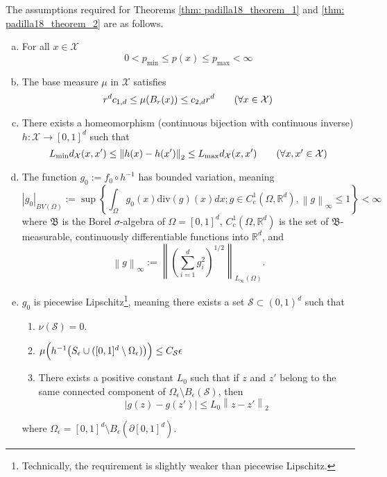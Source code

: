 \documentclass{article}
\newcommand{\Reals}{\mathbb{R}}
\newcommand{\norm}[1]{\left\lVert#1\right\rVert}
\newcommand{\abs}[1]{\left \lvert #1 \right \rvert}
\newcommand{\set}[1]{\left\{#1\right\}}
\newcommand{\Rd}{\Reals^d}
\newcommand{\Xset}{\mathcal{X}}
\newcommand{\Sset}{\mathcal{S}}
\newcommand{\dive}{\mathrm{div}}
\theoremstyle{alden}
\theoremstyle{aldenthm}
\theoremstyle{definition}
\theoremstyle{remark}
\begin{document}
The assumptions required for Theorems \ref{thm: padilla18_theorem_1} and \ref{thm: padilla18_theorem_2} are as follows.
\begin{enumerate}[(a)]
	\item For all $x \in \Xset$
	\begin{equation*}
	0 < p_{\min} \leq p(x) \leq p_{\max} < \infty
	\end{equation*}
	\item The base measure $\mu$ in $\Xset$ satisfies
	\begin{equation*}
	r^d c_{1,d} \leq \mu(B_r(x)) \leq c_{2,d} r^d \tag{$\forall x \in \Xset$}
	\end{equation*}
	\item There exists a homeomorphism (continuous bijection with continuous inverse) $h: \Xset \to [0,1]^d$ such that
	\begin{equation*}
	L_{\min} d_{\Xset}(x,x') \leq \norm{h(x) - h(x')}_2  \leq L_{\max} d_{\Xset}(x,x') \tag{$\forall x,x' \in \Xset$}
	\end{equation*}
	\item The function $g_0 := f_0 \circ h^{-1}$ has bounded variation, meaning
	\begin{equation*}
	\abs{g_0}_{BV(\Omega)} := \sup \set{\int_{\Omega} g_0(x) \dive(g)(x)dx; g \in C_c^1(\Omega, \Rd), \norm{g}_{\infty} \leq 1} < \infty
	\end{equation*}
	where $\mathfrak{B}$ is the Borel $\sigma$-algebra of $\Omega = [0,1]^d$, $C_c^1(\Omega, \Rd)$ is the set of $\mathfrak{B}$-measurable, continuously differentiable functions into $\Rd$, and
	\begin{equation*}
	\norm{g}_{\infty} := \norm{\left(\sum_{i=1}^{d}g_i^2\right)^{1/2}}_{L_{\infty}(\Omega)}.
	\end{equation*}
	\item $g_0$ is piecewise Lipschitz\footnote{Technically, the requirement is slightly weaker than piecewise Lipschitz.}, meaning there exists a set $\Sset \subset (0,1)^d$ such that
	\begin{enumerate}
		\item $\nu(\Sset) = 0$.
		\item $\mu\Bigl( h^{-1}\bigl(S_{\epsilon} \cup ([0,1]^d \setminus \Omega_{\epsilon})\bigr) \Bigr) \leq C_{\Sset} \epsilon$
		\item There exists a positive constant $L_0$ such that if $z$ and $z'$ belong to the same connected component of $\Omega_{\epsilon} \setminus B_{\epsilon}(\Sset)$, then 
		\begin{equation*}
		\abs{g(z) - g(z')} \leq L_0 \norm{z - z'}_2
		\end{equation*}
	\end{enumerate}
	where $\Omega_{\epsilon} = [0,1]^d \setminus B_{\epsilon}(\partial [0,1]^d)$.
\end{enumerate}
\end{document}
